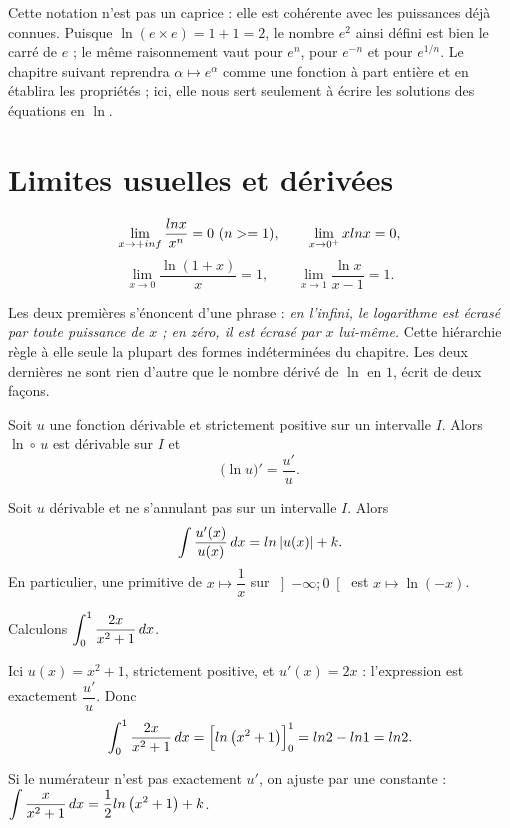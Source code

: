 \begin{remarque}
Cette notation n'est pas un caprice : elle est cohérente avec les puissances
déjà connues. Puisque $\ln\!\left(e \times e\right) = 1+1 = 2$, le nombre
$e^{2}$ ainsi défini est bien le carré de $e$ ; le même raisonnement vaut pour
$e^{n}$, pour $e^{-n}$ et pour $e^{1/n}$. Le chapitre suivant reprendra
$\alpha \mapsto e^{\alpha}$ comme une fonction à part entière et en établira
les propriétés ; ici, elle nous sert seulement à écrire les solutions des
équations en $\ln$.
\end{remarque}

\section{Limites usuelles et dérivées}

\begin{theoreme}
\[
  \limpinf \frac{\ln x}{x^{n}} = 0 \ (n \geq 1), \qquad
  \lim_{x \to 0^{+}} x\ln x = 0,
\]
\[
  \lim_{x \to 0} \frac{\ln(1+x)}{x} = 1, \qquad
  \lim_{x \to 1} \frac{\ln x}{x-1} = 1 .
\]
\end{theoreme}

\begin{remarque}
Les deux premières s'énoncent d'une phrase : \emph{en l'infini, le logarithme
est écrasé par toute puissance de $x$ ; en zéro, il est écrasé par $x$
lui-même.} Cette hiérarchie règle à elle seule la plupart des formes
indéterminées du chapitre. Les deux dernières ne sont rien d'autre que le
nombre dérivé de $\ln$ en $1$, écrit de deux façons.
\end{remarque}

\begin{theoreme}
Soit $u$ une fonction dérivable et strictement positive sur un intervalle $I$.
Alors $\ln \circ\, u$ est dérivable sur $I$ et
\[
  \bigl(\ln u\bigr)' = \frac{u'}{u} .
\]
\end{theoreme}

\begin{theoreme}
Soit $u$ dérivable et ne s'annulant pas sur un intervalle $I$. Alors
\[
  \int \frac{u'(x)}{u(x)}\,dx = ln\left|u(x)\right| + k .
\]
En particulier, une primitive de $x \mapsto \dfrac{1}{x}$ sur
$\left]-\infty;0\right[$ est $x \mapsto \ln(-x)$.
\end{theoreme}

\begin{exemple}
Calculons $\displaystyle\int_{0}^{1} \frac{2x}{x^{2}+1}\,dx$.

Ici $u(x) = x^{2}+1$, strictement positive, et $u'(x) = 2x$ : l'expression est
exactement $\dfrac{u'}{u}$. Donc
\[
  \int_{0}^{1} \frac{2x}{x^{2}+1}\,dx = \Bigl[ln\left(x^{2}+1\right)\Bigr]_{0}^{1}
  = ln 2 - ln 1 = ln 2 .
\]

\smallskip
Si le numérateur n'est pas exactement $u'$, on ajuste par une constante :
$\displaystyle\int \frac{x}{x^{2}+1}\,dx = \frac{1}{2}ln\left(x^{2}+1\right)+k$.
\end{exemple}

